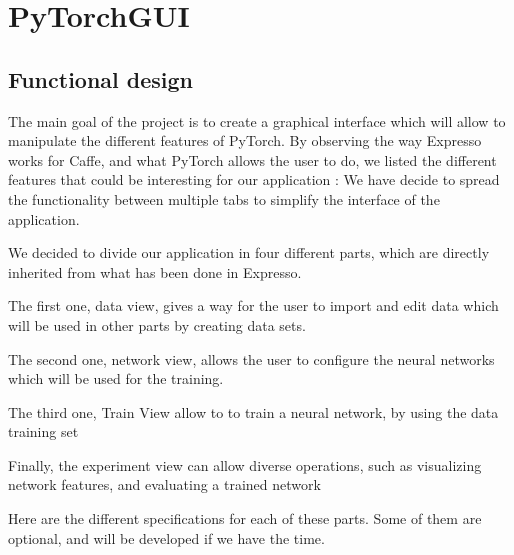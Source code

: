 \section{PyTorchGUI}
\subsection{Functional design}

The main goal of the project is to create a graphical interface which will allow to manipulate the different features of PyTorch. By observing the way Expresso works for Caffe, and what PyTorch allows the user to do, we listed the different features that could be interesting for our application :
We have decide to spread the functionality between multiple tabs to simplify the interface of the application.

We decided to divide our application in four different parts, which are directly inherited from what has been done in Expresso.

The first one, data view, gives a way for the user to import and edit data which will be used in other parts by creating data sets.

The second one, network view, allows the user to configure the neural networks which will be used for the training.

The third one, Train View allow to to train a neural network, by using the data training set

Finally, the experiment view can allow diverse operations, such as visualizing network features, and evaluating a trained network

Here are the different specifications for each of these parts. Some of them are optional, and will be developed if we have the time.

